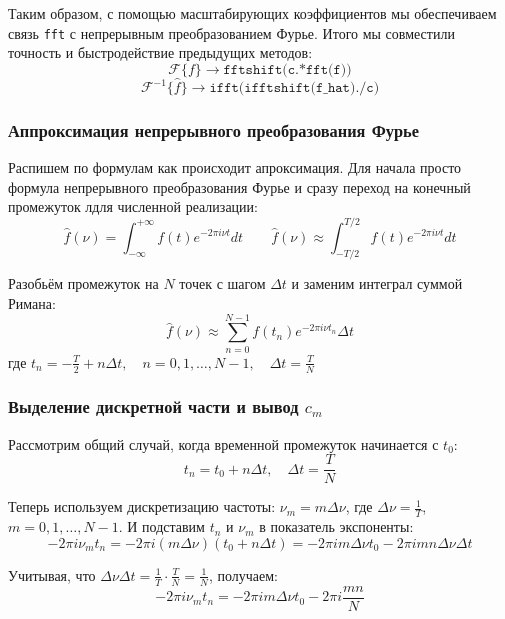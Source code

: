\documentclass[a4paper, 12pt]{article}
\begin{document}
Таким образом, с помощью масштабирующих коэффициентов мы обеспечиваем связь \texttt{fft} с непрерывным преобразованием Фурье. Итого мы совместили точность и быстродействие предыдущих методов:
\[
\mathcal{F}\{f\} \rightarrow \texttt{fftshift(c.*fft(f))}
\]
\[
\mathcal{F}^{-1}\{\hat{f}\} \rightarrow \texttt{ifft(ifftshift(f\_hat)./c)}
\]

\subsubsection*{Аппроксимация непрерывного преобразования Фурье}

Распишем по формулам как происходит апроксимация. Для начала просто формула непрерывного преобразования Фурье и сразу переход на конечный промежуток лдля численной реализации:
\begin{equation*}
    \hat{f}(\nu) = \int_{-\infty}^{+\infty} f(t)e^{-2\pi i \nu t} dt \quad \quad \hat{f}(\nu) \approx \int_{-T/2}^{T/2} f(t)e^{-2\pi i \nu t} dt
\end{equation*}

Разобьём промежуток на $N$ точек с шагом $\Delta t$ и заменим интеграл суммой Римана:
\begin{equation*}
    \hat{f}(\nu) \approx \sum_{n=0}^{N-1} f(t_n)e^{-2\pi i \nu t_n} \Delta t
\end{equation*}
где $t_n = -\frac{T}{2} + n\Delta t, \quad n = 0, 1, \ldots, N-1, \quad \Delta t = \frac{T}{N}$

\subsubsection*{Выделение дискретной части и вывод $c_m$}

Рассмотрим общий случай, когда временной промежуток начинается с $t_0$:
\begin{equation*}
    t_n = t_0 + n\Delta t, \quad \Delta t = \frac{T}{N}
\end{equation*}

Теперь используем дискретизацию частоты: $\nu_m = m\Delta \nu$, где $\Delta \nu = \frac{1}{T}$, $m = 0, 1, \ldots, N-1$. И подставим $t_n$ и $\nu_m$ в показатель экспоненты:
\begin{equation*}
    -2\pi i \nu_m t_n = -2\pi i (m\Delta \nu)(t_0 + n\Delta t) = -2\pi i m\Delta \nu t_0 - 2\pi i mn\Delta \nu \Delta t
\end{equation*}

Учитывая, что $\Delta \nu \Delta t = \frac{1}{T} \cdot \frac{T}{N} = \frac{1}{N}$, получаем:
\begin{equation*}
    -2\pi i \nu_m t_n = -2\pi i m\Delta \nu t_0 - 2\pi i \frac{mn}{N}
\end{equation*}
\end{document}
